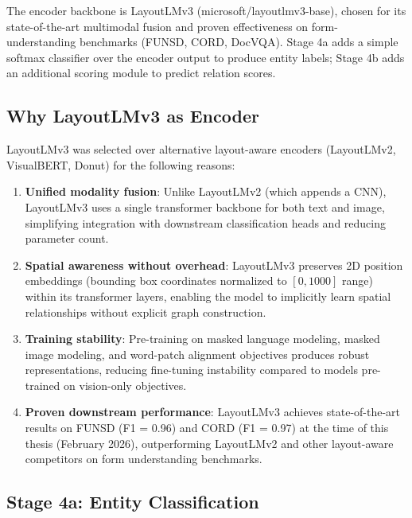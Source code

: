 The encoder backbone is LayoutLMv3 (microsoft/layoutlmv3-base), chosen for its state-of-the-art multimodal fusion and proven effectiveness on form-understanding benchmarks (FUNSD, CORD, DocVQA). Stage 4a adds a simple softmax classifier over the encoder output to produce entity labels; Stage 4b adds an additional scoring module to predict relation scores.

\subsection{Why LayoutLMv3 as Encoder}
\label{sec:layoutlmv3_justification}

LayoutLMv3 was selected over alternative layout-aware encoders (LayoutLMv2, VisualBERT, Donut) for the following reasons:

\begin{enumerate}
    \item \textbf{Unified modality fusion}: Unlike LayoutLMv2 (which appends a CNN), LayoutLMv3 uses a single transformer backbone for both text and image, simplifying integration with downstream classification heads and reducing parameter count.
    
    \item \textbf{Spatial awareness without overhead}: LayoutLMv3 preserves 2D position embeddings (bounding box coordinates normalized to $[0, 1000]$ range) within its transformer layers, enabling the model to implicitly learn spatial relationships without explicit graph construction.
    
    \item \textbf{Training stability}: Pre-training on masked language modeling, masked image modeling, and word-patch alignment objectives produces robust representations, reducing fine-tuning instability compared to models pre-trained on vision-only objectives.
    
    \item \textbf{Proven downstream performance}: LayoutLMv3 achieves state-of-the-art results on FUNSD (F1 = 0.96) and CORD (F1 = 0.97) at the time of this thesis (February 2026), outperforming LayoutLMv2 and other layout-aware competitors on form understanding benchmarks.
\end{enumerate}

\subsection{Stage 4a: Entity Classification}
\label{sec:stage4a_entity_classification}

